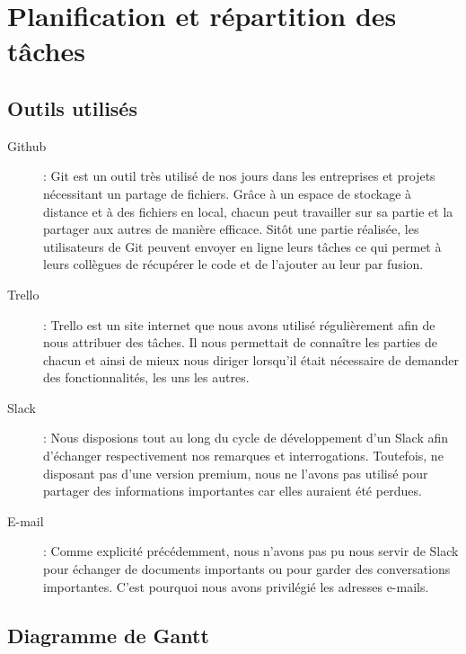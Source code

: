 \section{Planification et répartition des tâches}

\subsection{Outils utilisés}

\begin{description}

\item[Github] : 
Git est un outil très utilisé de nos jours dans les entreprises et projets nécessitant un partage de fichiers. Grâce à un espace de stockage à distance et à des fichiers en local, chacun peut travailler sur sa partie et la partager aux autres de manière efficace. Sitôt une partie réalisée, les utilisateurs de Git peuvent envoyer en ligne leurs tâches ce qui permet à leurs collègues de récupérer le code et de l'ajouter au leur par fusion.

\item[Trello] :
Trello est un site internet que nous avons utilisé régulièrement afin de nous attribuer des tâches. Il nous permettait de connaître les parties de chacun et ainsi de mieux nous diriger lorsqu'il était nécessaire de demander des fonctionnalités, les uns les autres.

\item[Slack] :
Nous disposions tout au long du cycle de développement d'un Slack afin d'échanger respectivement nos remarques et interrogations. Toutefois, ne disposant pas d'une version premium, nous ne l'avons pas utilisé pour partager des informations importantes car elles auraient été perdues.

\item[E-mail] :
Comme explicité précédemment, nous n'avons pas pu nous servir de Slack pour échanger de documents importants ou pour garder des conversations importantes. C'est pourquoi nous avons privilégié les adresses e-mails.

\end{description}

\subsection{Diagramme de Gantt}

